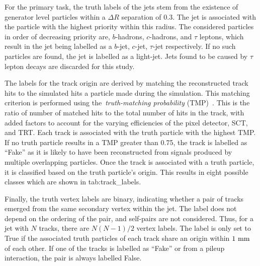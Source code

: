 For the primary task, the truth labels of the jets stem from the existence of generator level particles within a $\Delta R$ separation of 0.3.
The jet is associated with the particle with the highest priority within this radius.
The considered particles in order of decreasing priority are, $b$-hadrons, $c$-hadrons, and $\tau$ leptons, which result in the jet being labelled as a $b$-jet, $c$-jet, $\tau$-jet respectively.
If no such particles are found, the jet is labelled as a light-jet.
Jets found to be caused by $\tau$ lepton decays are discarded for this study.

The labels for the track origin are derived by matching the reconstructed track hits to the simulated hits a particle made during the \geant simulation.
This matching criterion is performed using the~\textit{truth-matching probability} (TMP)~\cite{PerformanceATLASTrack}.
This is the ratio of number of matched hits to the total number of hits in the track, with added factors to account for the varying efficiencies of the pixel detector, SCT, and TRT\@.
Each track is associated with the truth particle with the highest TMP\@.
If no truth particle results in a TMP greater than 0.75, the track is labelled as ``Fake'' as it is likely to have been reconstructed from signals produced by multiple overlapping particles.
Once the track is associated with a truth particle, it is classified based on the truth particle's origin.
This results in eight possible classes which are shown in \Cref
{tab:track_labels}.

Finally, the truth vertex labels are binary, indicating whether a pair of tracks emerged from the same secondary vertex within the jet.
The label does not depend on the ordering of the pair, and self-pairs are not considered.
Thus, for a jet with $N$ tracks, there are $N(N-1)/2$ vertex labels.
The label is only set to True if the associated truth particles of each track share an origin within $1~\mm$ of each other.
If one of the tracks is labelled as ``Fake'' or from a pileup interaction, the pair is always labelled False.

